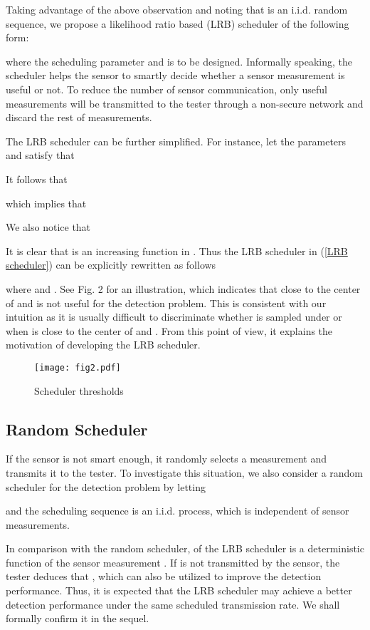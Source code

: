 \documentclass[journal]{IEEEtran}
\begin{document}
Taking advantage of the above observation and noting that  is an i.i.d. random sequence, we propose a likelihood ratio based (LRB) scheduler of the following form:

where the scheduling parameter  and is to be designed. Informally speaking, the scheduler helps the sensor to smartly decide whether a sensor measurement is useful or not.  To reduce the number of sensor communication, only useful measurements will be transmitted to the tester through a non-secure network and discard the rest of measurements.

The LRB scheduler can be further simplified. For instance, let the parameters  and  satisfy that

It follows that

which implies that

We also notice that

It is clear that  is an increasing function in . Thus the LRB scheduler in (\ref{LRB scheduler}) can be explicitly rewritten as follows

where  and . See Fig. 2 for an illustration, which indicates that  close to the center of  and  is not useful for the detection problem. This is consistent with our intuition as it is usually difficult to discriminate whether  is sampled under  or  when  is close to the center of  and . From this point of view, it explains the motivation of developing the LRB scheduler.

\begin{figure}[htbp!]
  \centering
  \texttt{[image: fig2.pdf]}
    \caption{Scheduler thresholds}
  \label{fig2}
\end{figure}

\subsection{Random Scheduler}
If the sensor is not smart enough, it randomly selects a measurement and transmits it to the tester. To investigate this situation, we also consider a random scheduler for the detection problem by letting

and the scheduling sequence  is an i.i.d. process, which is independent of sensor measurements.

 In comparison with the random scheduler,  of the LRB scheduler is a deterministic function of the sensor measurement .  If  is not transmitted by the sensor, the tester deduces that , which can also be utilized to improve the detection performance. Thus, it is expected that the LRB scheduler may achieve a better detection performance under the same scheduled transmission rate. We shall formally confirm it in the sequel.
\end{document}
